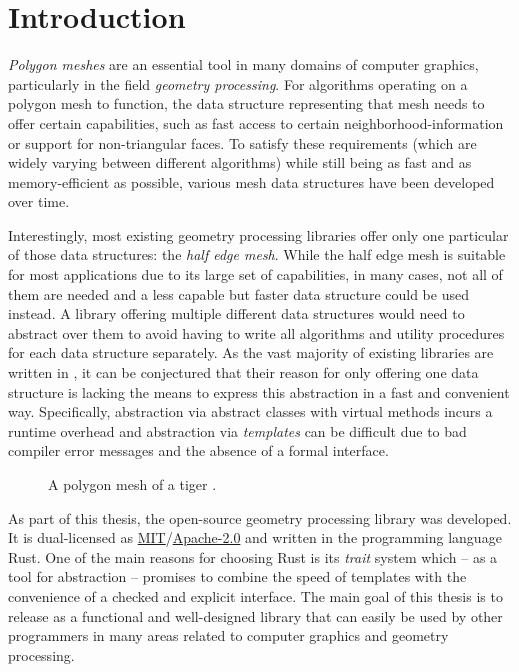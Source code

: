 \chapter{Introduction}

\emph{Polygon meshes} are an essential tool in many domains of computer graphics, particularly in the field \emph{geometry processing}.
For algorithms operating on a polygon mesh to function, the data structure representing that mesh needs to offer certain capabilities, such as fast access to certain neighborhood-information or support for non-triangular faces.
To satisfy these requirements (which are widely varying between different algorithms) while still being as fast and as memory-efficient as possible, various mesh data structures have been developed over time.

Interestingly, most existing geometry processing libraries offer only one particular of those data structures: the \emph{half edge mesh}.
While the half edge mesh is suitable for most applications due to its large set of capabilities, in many cases, not all of them are needed and a less capable but faster data structure could be used instead.
A library offering multiple different data structures would need to abstract over them to avoid having to write all algorithms and utility procedures for each data structure separately.
As the vast majority of existing libraries are written in \cpp, it can be conjectured that their reason for only offering one data structure is \cpp lacking the means to express this abstraction in a fast and convenient way.
Specifically, abstraction via abstract classes with virtual methods incurs a runtime overhead and abstraction via \emph{\cpp templates} can be difficult due to bad compiler error messages and the absence of a formal interface.

\vspace{5mm}

\begin{figure}[h]
  \centering
  
  \caption{A polygon mesh of a tiger \cite{tigermodel}.}
\end{figure}

\vspace{1cm}

As part of this thesis, the open-source geometry processing library  was developed.
It is dual-licensed as \hyperlink{mit}{MIT}/\hyperlink{apache2}{Apache-2.0} and written in the programming language Rust.
One of the main reasons for choosing Rust is its \emph{trait} system which -- as a tool for abstraction -- promises to combine the speed of \cpp templates with the convenience of a checked and explicit interface.
The main goal of this thesis is to release  as a functional and well-designed library that can easily be used by other programmers in many areas related to computer graphics and geometry processing.

